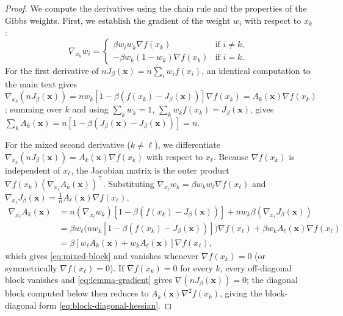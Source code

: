 \documentclass{article}
\theoremstyle{plain}
\theoremstyle{definition}
\theoremstyle{remark}
\newcommand{\prefactor}[2]{A_{#1}(#2)}
\newcommand{\xx}{\mathbf{x}}
\begin{document}
\begin{proof}
    We compute the derivatives using the chain rule and the properties of the Gibbs weights. First, we establish the gradient of the weight $w_i$ with respect to $x_k$:
    \begin{equation*}
        \nabla_{x_k} w_i = \begin{cases}
            \beta w_i w_k \nabla f(x_k) & \text{if } i \neq k, \\
            -\beta w_k (1 - w_k) \nabla f(x_k) & \text{if } i = k.
        \end{cases}
    \end{equation*}
    For the first derivative of $nJ_\beta(\xx) = n\sum_i w_i f(x_i)$, an identical computation to the main text gives $\nabla_{x_k}(nJ_\beta(\xx)) = nw_k[1-\beta(f(x_k)-J_\beta(\xx))]\nabla f(x_k) = \prefactor{k}{\xx}\nabla f(x_k)$; summing over $k$ and using $\sum_k w_k=1$, $\sum_k w_kf(x_k)=J_\beta(\xx)$, gives $\sum_k\prefactor{k}{\xx}=n[1-\beta(J_\beta(\xx)-J_\beta(\xx))]=n$.

    For the mixed second derivative ($k\ne\ell$), we differentiate $\nabla_{x_k}(nJ_\beta(\xx))=\prefactor{k}{\xx}\nabla f(x_k)$ with respect to $x_\ell$. Because $\nabla f(x_k)$ is independent of $x_\ell$, the Jacobian matrix is the outer product $\nabla f(x_k)(\nabla_{x_\ell}\prefactor{k}{\xx})^\top$. Substituting $\nabla_{x_\ell}w_k=\beta w_kw_\ell\nabla f(x_\ell)$ and $\nabla_{x_\ell}J_\beta(\xx)=\frac1n\prefactor{\ell}{\xx}\nabla f(x_\ell)$,
    \begin{align*}
        \nabla_{x_\ell}\prefactor{k}{\xx} &= n(\nabla_{x_\ell}w_k)\left[1-\beta(f(x_k)-J_\beta(\xx))\right] + nw_k\beta\left(\nabla_{x_\ell}J_\beta(\xx)\right) \\
        &= \beta w_\ell\bigl(nw_k[1-\beta(f(x_k)-J_\beta(\xx))]\bigr)\nabla f(x_\ell) + \beta w_k\prefactor{\ell}{\xx}\nabla f(x_\ell) \\
        &= \beta\left[w_\ell\prefactor{k}{\xx}+w_k\prefactor{\ell}{\xx}\right]\nabla f(x_\ell),
    \end{align*}
    which gives \eqref{eq:mixed-block} and vanishes whenever $\nabla f(x_k)=0$ (or symmetrically $\nabla f(x_\ell)=0$). If $\nabla f(x_k)=0$ for every $k$, every off-diagonal block vanishes and \eqref{eq:lemma-gradient} gives $\nabla(nJ_\beta(\xx))=0$; the diagonal block computed below then reduces to $\prefactor{k}{\xx}\nabla^2f(x_k)$, giving the block-diagonal form \eqref{eq:block-diagonal-hessian}.


\end{proof}
\end{document}
